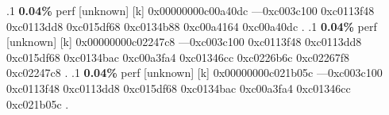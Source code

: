 \begin{profile}
{.1 \textbf{ 0.04\%} perf             [unknown]              [k] 0x00000000c00a40dc\newline {} ---0xc003c100\newline {} 0xc0113f48\newline {} 0xc0113dd8\newline {} 0xc015df68\newline {} 0xc0134b88\newline {} 0xc00a4164\newline {} 0xc00a40dc\newline {} . 
.1 \textbf{ 0.04\%} perf             [unknown]              [k] 0x00000000c02247c8\newline {} ---0xc003c100\newline {} 0xc0113f48\newline {} 0xc0113dd8\newline {} 0xc015df68\newline {} 0xc0134bac\newline {} 0xc00a3fa4\newline {} 0xc01346cc\newline {} 0xc0226b6c\newline {} 0xc02267f8\newline {} 0xc02247c8\newline {} . 
.1 \textbf{ 0.04\%} perf             [unknown]              [k] 0x00000000c021b05c\newline {} ---0xc003c100\newline {} 0xc0113f48\newline {} 0xc0113dd8\newline {} 0xc015df68\newline {} 0xc0134bac\newline {} 0xc00a3fa4\newline {} 0xc01346cc\newline {} 0xc021b05c\newline {} . 
}
\end{profile}

